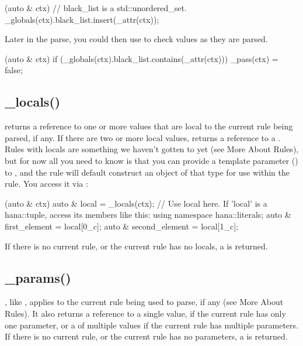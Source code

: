 \documentclass{MyBook}
\begin{document}
\begin{code}
[](auto & ctx) {
    // black_list is a std::unordered_set.
    _globals(ctx).black_list.insert(_attr(ctx));
}
\end{code}

Later in the parse, you could then use  to check values as they are parsed.

\begin{code}
[](auto & ctx) {
    if (_globals(ctx).black_list.contains(_attr(ctx)))
        _pass(ctx) = false;
}
\end{code}

\subsection{\_locals()}

 returns a reference to one or more values that are local to the current rule being parsed, if any. If there are two or more local values,  returns a reference to a . Rules with locals are something we haven't gotten to yet (see More About Rules), but for now all you need to know is that you can provide a template parameter () to , and the rule will default construct an object of that type for use within the rule. You access it via :

\begin{code}
[](auto & ctx) {
    auto & local = _locals(ctx);
    // Use local here.  If 'local' is a hana::tuple, access its members like this:
    using namespace hana::literals;
    auto & first_element = local[0_c];
    auto & second_element = local[1_c];
}
\end{code}

If there is no current rule, or the current rule has no locals, a  is returned.

\subsection{\_params()}

, like , applies to the current rule being used to parse, if any (see More About Rules). It also returns a reference to a single value, if the current rule has only one parameter, or a  of multiple values if the current rule has multiple parameters. If there is no current rule, or the current rule has no parameters, a  is returned.
\end{document}
